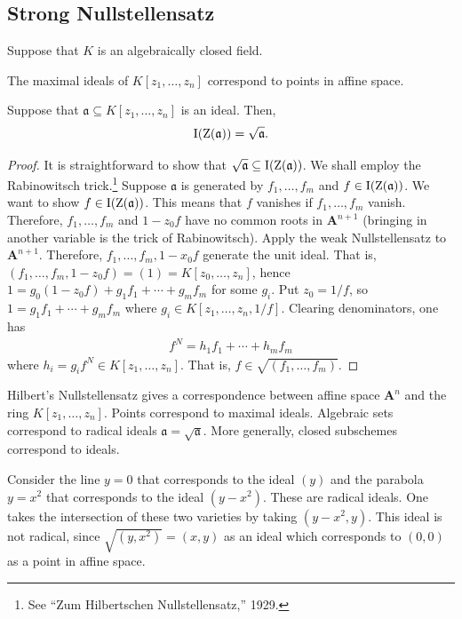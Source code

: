 \documentclass [11 pt, oneside] {article}
\begin{document}
\subsection{Strong Nullstellensatz}
Suppose that $K$ is an algebraically closed field.

\begin{theorem}\label{}\index{}
The maximal ideals of $K[z_1,\hdots, z_n]$ correspond to points in affine space.
\end{theorem}

\begin{theorem}\label{}\index{}
Suppose that $\mathfrak{a}\subseteq K[z_1,\hdots, z_n]$ is an ideal. Then, 
\begin{align*}
	\operatorname{I}(\operatorname{Z}(\mathfrak{a})) = \sqrt{\mathfrak{a}} .
\end{align*}
\end{theorem}

\begin{proof}
It is straightforward to show that $\sqrt{\mathfrak{a}} \subseteq \operatorname{I}(\operatorname{Z}(\mathfrak{a}))$. We shall employ the Rabinowitsch trick.\footnote{See ``Zum Hilbertschen Nullstellensatz,'' 1929.} Suppose $\mathfrak{a}$ is generated by $f_1,\hdots, f_m$ and $f\in \operatorname{I}(\operatorname{Z}(\mathfrak{a}))$. We want to show $f\in \operatorname{I}(\operatorname{Z}(\mathfrak{a}))$. This means that $f$ vanishes if $f_1,\hdots, f_m$ vanish. Therefore, $f_1,\hdots, f_m$ and $1-z_0f$ have no common roots in $\mathbf{A}^{n+1}$ (bringing in another variable is the trick of Rabinowitsch). Apply the weak Nullstellensatz to $\mathbf{A}^{n+1}$. Therefore, $f_1,\hdots, f_m, 1-x_0f$ generate the unit ideal. That is, $(f_1,\hdots,f_m,1-z_0f) = (1) = K[z_0,\hdots, z_n]$, hence $1 = g_0(1-z_0f)+g_1f_1 +\cdots + g_mf_m$ for some $g_i$. Put $z_0=1/f$, so $1=g_1f_1+\cdots +g_mf_m$ where $g_i \in K[z_1,\hdots, z_n, 1/f]$. Clearing denominators, one has
\begin{align*}
	f^N = h_1f_1+\cdots + h_mf_m
\end{align*}
where $h_i=g_if^N\in K[z_1,\hdots, z_n]$. That is, $f\in \sqrt{(f_1,\hdots, f_m)} $.
\end{proof}

Hilbert's Nullstellensatz gives a correspondence between affine space $\mathbf{A}^n$ and the ring $K[z_1,\hdots, z_n]$. Points correspond to maximal ideals. Algebraic sets correspond to radical ideals $\mathfrak{a} = \sqrt{\mathfrak{a}} $. More generally, closed subschemes correspond to ideals.

\begin{example}[ ]\label{}
Consider the line $y=0$ that corresponds to the ideal $(y)$ and the parabola $y=x^2$ that corresponds to the ideal $(y-x^2)$. These are radical ideals. One takes the intersection of these two varieties by taking $(y-x^2, y)$. This ideal is not radical, since $\sqrt{(y, x^2)}=(x,y)$ as an ideal which corresponds to $(0,0)$ as a point in affine space.
\end{example}
\end{document}
